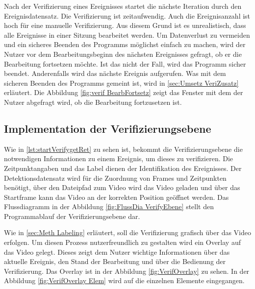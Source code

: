 Nach der Verifizierung eines Ereignisses startet die nächste Iteration durch den Ereignisdatensatz. Die Verifizierung ist zeitaufwendig. Auch die Ereignisanzahl ist hoch für eine manuelle Verifizierung. Aus diesem Grund ist es unrealistisch, dass alle Ereignisse in einer Sitzung bearbeitet werden. Um Datenverlust zu vermeiden und ein sicheres Beenden des Programms möglichst einfach zu machen, wird der Nutzer vor dem Bearbeitungsbeginn des nächsten Ereignisses gefragt, ob er die Bearbeitung fortsetzen möchte. Ist das nicht der Fall, wird das Programm sicher beendet. Anderenfalls wird das nächste Ereignis aufgerufen. Was mit dem sicheren Beenden des Programms gemeint ist, wird in \ref{sec:Umsetz VeriZusatz} erläutert. Die Abbildung \ref{fig:verif BearbFortsetz} zeigt das Fenster mit dem der Nutzer abgefragt wird, ob die Bearbeitung fortzusetzen ist.


\subsection{Implementation der Verifizierungsebene} \label{sec:Umsetz VeriEbene}
Wie in \ref{lst:startVerifygetRet} zu sehen ist, bekommt die Verifizierungsebene die notwendigen Informationen zu einem Ereignis, um dieses zu verifizieren. Die Zeitpunktangaben und das Label dienen der Identifikation des Ereignisses. Der Detektionsdatensatz wird für die Zuordnung von Frames und Zeitpunkten benötigt, über den Dateipfad zum Video wird das Video geladen und über das Startframe kann das Video an der korrekten Position geöffnet werden. Das Flussdiagramm in der Abbildung \ref{fig:FlussDia VerifyEbene} stellt den Programmablauf der Verifizierungsebene dar. 


Wie in \ref{sec:Meth Labeling} erläutert, soll die Verifizierung grafisch über das Video erfolgen. Um diesen Prozess nutzerfreundlich zu gestalten wird ein Overlay auf das Video gelegt. Dieses zeigt dem Nutzer wichtige Informationen über das aktuelle Ereignis, den Stand der Bearbeitung und über die Bedienung der Verifizierung. Das Overlay ist in der Abbildung \ref{fig:VerifOverlay} zu sehen. In der Abbildung \ref{fig:VerifOverlay Elem} wird auf die einzelnen Elemente eingegangen.

